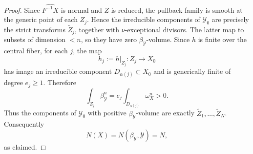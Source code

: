 \documentclass[10pt,a4paper]{amsart}
\newcommand{\cY}{\mathcal{Y}}
\begin{document}
\begin{proof}
Since \(\widehat{F^{-1}X}\) is normal and \(Z\) is reduced, the pullback
family is smooth at the generic point of each \(Z_j\). Hence the
irreducible components of \(\cY_0\) are precisely the strict transforms
\(\widetilde Z_j\), together with \(\nu\)-exceptional divisors. The latter
map to subsets of dimension \(<n\), so they have zero \(\beta_\cY\)-volume.
Since \(h\) is finite over the central fiber, for each \(j\), the map
\[
h_j:=h|_{Z_j}\colon Z_j\to X_0
\]
has image an irreducible component \(D_{\alpha(j)}\subset X_0\) and is
generically finite of degree \(e_j\ge 1\). Therefore
\[
\int_{\widetilde Z_j}\beta_\cY^n
=
e_j\int_{D_{\alpha(j)}}\omega_X^n
>0.
\]
Thus the components of \(\cY_0\) with positive \(\beta_\cY\)-volume are
exactly \(\widetilde Z_1,\dots,\widetilde Z_N\). Consequently
\[
N(X)=N(\beta_\cY,\cY)=N,
\]
as claimed.
\end{proof}
\end{document}
